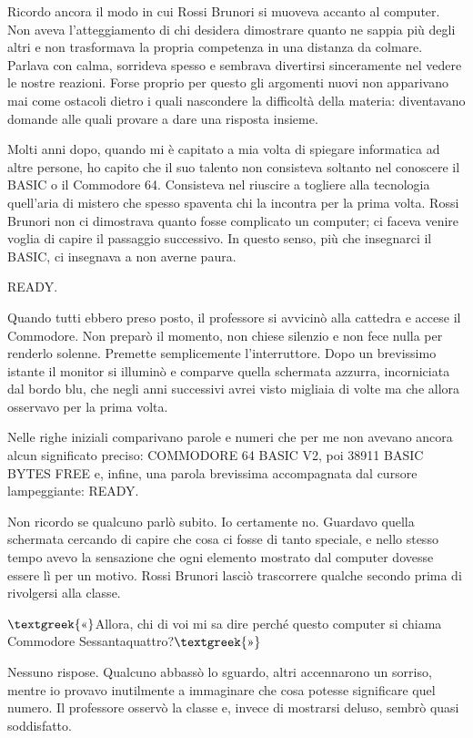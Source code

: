 \documentclass{article}
\begin{document}
Ricordo ancora il modo in cui Rossi Brunori si muoveva accanto al computer. Non aveva l'atteggiamento di chi desidera
dimostrare quanto ne sappia più degli altri e non trasformava la propria competenza in una distanza da colmare. Parlava
con calma, sorrideva spesso e sembrava divertirsi sinceramente nel vedere le nostre reazioni. Forse proprio per questo
gli argomenti nuovi non apparivano mai come ostacoli dietro i quali nascondere la difficoltà della materia: diventavano
domande alle quali provare a dare una risposta insieme.

Molti anni dopo, quando mi è capitato a mia volta di spiegare informatica ad altre persone, ho capito che il suo talento
non consisteva soltanto nel conoscere il BASIC o il Commodore 64. Consisteva nel riuscire a togliere alla tecnologia
quell'aria di mistero che spesso spaventa chi la incontra per la prima volta. Rossi Brunori non ci dimostrava quanto
fosse complicato un computer; ci faceva venire voglia di capire il passaggio successivo. In questo senso, più che
insegnarci il BASIC, ci insegnava a non averne paura.

READY.

Quando tutti ebbero preso posto, il professore si avvicinò alla cattedra e accese il Commodore. Non preparò il momento,
non chiese silenzio e non fece nulla per renderlo solenne. Premette semplicemente l'interruttore. Dopo un brevissimo
istante il monitor si illuminò e comparve quella schermata azzurra, incorniciata dal bordo blu, che negli anni
successivi avrei visto migliaia di volte ma che allora osservavo per la prima volta.

Nelle righe iniziali comparivano parole e numeri che per me non avevano ancora alcun significato preciso: COMMODORE 64
BASIC V2, poi 38911 BASIC BYTES FREE e, infine, una parola brevissima accompagnata dal cursore lampeggiante: READY.

Non ricordo se qualcuno parlò subito. Io certamente no. Guardavo quella schermata cercando di capire che cosa ci fosse
di tanto speciale, e nello stesso tempo avevo la sensazione che ogni elemento mostrato dal computer dovesse essere lì
per un motivo. Rossi Brunori lasciò trascorrere qualche secondo prima di rivolgersi alla classe.

$\text{\textgreek{«}}$Allora, chi di voi mi sa dire perché questo computer si chiama Commodore
Sessantaquattro?$\text{\textgreek{»}}$

Nessuno rispose. Qualcuno abbassò lo sguardo, altri accennarono un sorriso, mentre io provavo inutilmente a immaginare
che cosa potesse significare quel numero. Il professore osservò la classe e, invece di mostrarsi deluso, sembrò quasi
soddisfatto.
\end{document}
